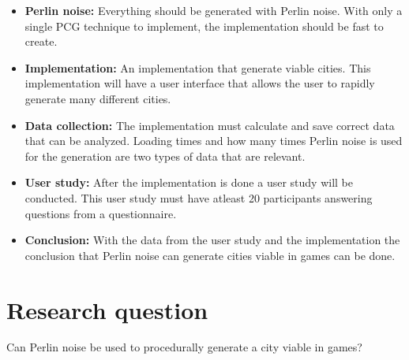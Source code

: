 	\begin{itemize}
		\item \textbf{Perlin noise:} Everything should be generated with Perlin noise.
		With only a single PCG technique to implement, the implementation should be fast to create.
		
		\item \textbf{Implementation:} An implementation that generate viable cities. This implementation will have a user interface that allows the user to rapidly generate many different cities.
		
		\item \textbf{Data collection:} The implementation must calculate and save correct data that can be analyzed. Loading times and how many times Perlin noise is used for the generation are two types of data that are relevant.
		
		\item \textbf{User study:} After the implementation is done a user study will be conducted. This user study must have atleast 20 participants answering questions from a questionnaire.
		
		\item \textbf{Conclusion: } With the data from the user study and the implementation the conclusion that Perlin noise can generate cities viable in games can be done.
	\end{itemize} 
	
	\section{Research question}
	Can Perlin noise be used to procedurally generate a city viable in games?
